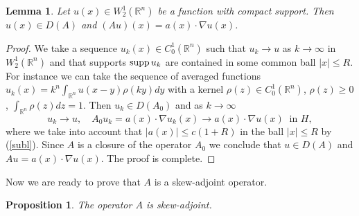 \documentclass[12pt]{article}
\newcommand{\R}{{\mathbb R}}
\newcommand{\supp}{\mathop{\rm supp}}
\numberwithin{equation}{section}
\theoremstyle{plain}
\newtheorem{lemma}{Lemma}[section]
\newtheorem{proposition}{Proposition}[section]
\theoremstyle{definition}
\begin{document}
\begin{lemma}\label{lm1a}
Let $u(x)\in W_2^1(\R^n)$ be a function with compact support. Then $u(x)\in D(A)$ and $(Au)(x)=a(x)\cdot\nabla u(x)$.
\end{lemma}

\begin{proof}
We take a sequence $u_k(x)\in C_0^1(\R^n)$ such that $u_k\to u$ as $k\to\infty$ in $W_2^1(\R^n)$ and that
supports $\supp u_k$ are contained in some common ball $|x|\le R$. For instance we can take the sequence of averaged functions $u_k(x)=k^n\int_{\R^n}u(x-y)\rho(ky)dy$ with a kernel $\rho(z)\in C_0^1(\R^n)$, $\rho(z)\ge 0$, $\int_{\R^n}\rho(z)dz=1$. Then $u_k\in D(A_0)$ and as $k\to\infty$
\[ u_k\to u, \quad A_0u_k=a(x)\cdot\nabla u_k(x)\to a(x)\cdot\nabla u(x) \ \mbox{ in } H,\]
where we take into account that $|a(x)|\le c(1+R)$ in the ball $|x|\le R$ by (\ref{subl}). Since $A$ is a closure of  the operator $A_0$ we conclude that $u\in D(A)$ and  $Au=a(x)\cdot\nabla u(x)$. The proof is complete.
\end{proof}

Now we are ready to prove that $A$ is a skew-adjoint operator.

\begin{proposition}\label{pro1}
The operator $A$ is skew-adjoint.
\end{proposition}
\end{document}
